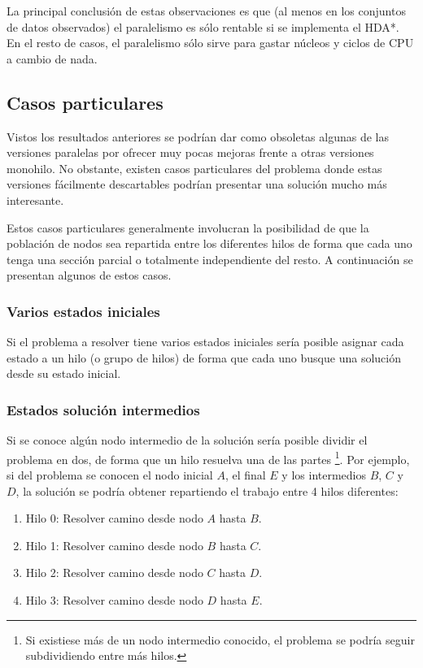 La principal conclusión de estas observaciones es que
(al menos en los conjuntos de datos observados)
el paralelismo es sólo rentable si se implementa el HDA*.
En el resto de casos, el paralelismo sólo sirve para
gastar núcleos y ciclos de CPU a cambio de nada.

\pagebreak

\subsection{Casos particulares}

Vistos los resultados anteriores
se podrían dar como obsoletas algunas de las versiones
paralelas por ofrecer muy pocas mejoras frente a otras
versiones monohilo.
No obstante, existen casos particulares del problema
donde estas versiones fácilmente descartables
podrían presentar una solución mucho más interesante.

Estos casos particulares generalmente involucran
la posibilidad de que la población de nodos sea
repartida entre los diferentes hilos de forma
que cada uno tenga una sección parcial o totalmente
independiente del resto.
A continuación se presentan algunos de estos casos.

\subsubsection{Varios estados iniciales}

Si el problema a resolver tiene varios estados iniciales
sería posible asignar cada estado a un hilo (o grupo de hilos)
de forma que cada uno busque una solución desde su estado inicial.

\subsubsection{Estados solución intermedios}

Si se conoce algún nodo intermedio de la solución
sería posible dividir el problema en dos,
de forma que un hilo resuelva una de las partes
\footnote{Si existiese más de un nodo intermedio conocido,
el problema se podría seguir subdividiendo entre más hilos.}.
Por ejemplo, si del problema se conocen el nodo inicial $A$,
el final $E$ y los intermedios $B$, $C$ y $D$,
la solución se podría obtener repartiendo el
trabajo entre 4 hilos diferentes:
\begin{enumerate}[itemsep=0.25px]
    \item Hilo 0: Resolver camino desde nodo $A$ hasta $B$.
    \item Hilo 1: Resolver camino desde nodo $B$ hasta $C$.
    \item Hilo 2: Resolver camino desde nodo $C$ hasta $D$.
    \item Hilo 3: Resolver camino desde nodo $D$ hasta $E$.
\end{enumerate}
